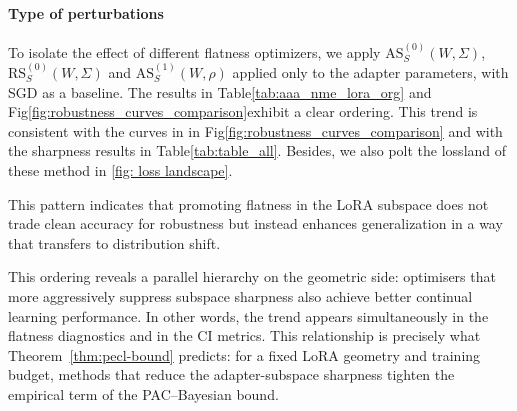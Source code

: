 \documentclass{article}
\theoremstyle{plain}
\theoremstyle{definition}
\theoremstyle{remark}
\begin{document}


\paragraph{Type of perturbations }

To isolate the effect of different flatness optimizers, we apply $\mathrm{AS}_S^{(0)}({W}, \Sigma)$,$\mathrm{RS}_S^{(0)}({W}, \Sigma)$ and $\mathrm{AS}^{(1)}_S(W,\rho)$ applied only to the adapter parameters, with SGD as a baseline. 
The results in Table\ref{tab:aaa_nme_lora_org}  and Fig\ref{fig:robustness_curves_comparison}exhibit a clear ordering. This trend is consistent with the curves in in Fig\ref{fig:robustness_curves_comparison} and with the sharpness results in Table\ref{tab:table_all}. Besides, we also polt the lossland of these method in \ref{fig: loss landscape}.

This pattern indicates that promoting flatness in the LoRA subspace does not trade clean accuracy for robustness but instead enhances generalization in a way that transfers to distribution shift. 




This ordering reveals a parallel hierarchy on the geometric side: optimisers that more aggressively suppress subspace sharpness also achieve better continual learning performance. In other words, the trend appears simultaneously in the flatness diagnostics and in the CI metrics. This  relationship is precisely what Theorem~\ref{thm:pecl-bound} predicts: for a fixed LoRA geometry and training budget, methods that reduce the adapter-subspace sharpness tighten the empirical term of the PAC–Bayesian bound.
\end{document}
